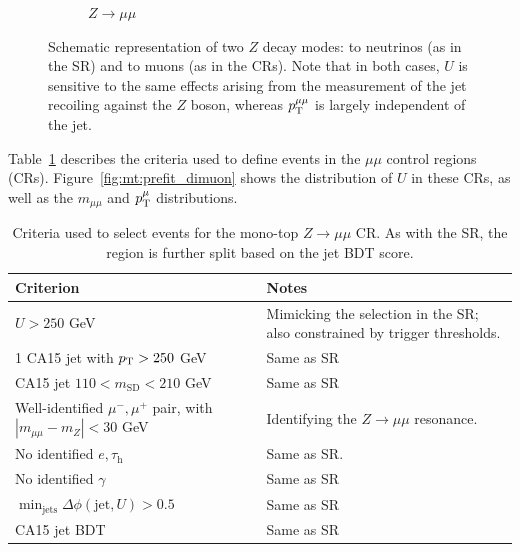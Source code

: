 \begin{figure}[]
\begin{center}
\begin{subfigure}[t]{0.49\textwidth}
            \caption{$Z\rightarrow\mu\mu$}
        \end{subfigure}
        \caption{Schematic representation of two $Z$ decay modes: to neutrinos (as in the SR) and to muons (as in the CRs).
                 Note that in both cases, $U$ is sensitive to the same effects arising from the measurement of the jet recoiling against the $Z$ boson, whereas $p_\mathrm{T}^{\mu\mu}$ is largely independent of the jet.}
        \label{fig:mt:zvsz}
    \end{center}
\end{figure}

Table~\ref{tab:mt:zmm_cuts} describes the criteria used to define events in the \emph{$\mu\mu$} control regions (CRs).
Figure~\ref{fig:mt:prefit_dimuon} shows the distribution of $U$ in these CRs, as well as the $m_{\mu\mu}$ and $p_\mathrm{T}^\mu$ distributions.

\begin{table}[]
    \caption{Criteria used to select events for the mono-top $Z\rightarrow\mu\mu$ CR. As with the SR, the region is further split based on the jet BDT score.}
    \label{tab:mt:zmm_cuts}
    \centering
    \begin{tabular}{p{}p{}}
        Criterion & Notes \\
        \hline
        \hline
        $U>250$ GeV & Mimicking the selection in the SR; also constrained by trigger thresholds. \\
        1 CA15 jet with $p_\mathrm{T}>250$ GeV &  Same as SR \\
        CA15 jet $110 < m_\mathrm{SD} < 210$ GeV & Same as SR \\
        \hline
        Well-identified $\mu^-,\mu^+$ pair, with $|m_{\mu\mu}-m_Z|<30$ GeV & Identifying the $Z\rightarrow\mu\mu$ resonance. \\
        No identified $e,\tau_\mathrm{h}$ & Same as SR. \\
        No identified $\gamma$ & Same as SR \\
        \hline
        $\min_\mathrm{jets}\Delta\phi(\mathrm{jet},U) > 0.5$ & Same as SR \\
        \hline
        CA15 jet BDT & Same as SR\\
    \end{tabular}
\end{table}

